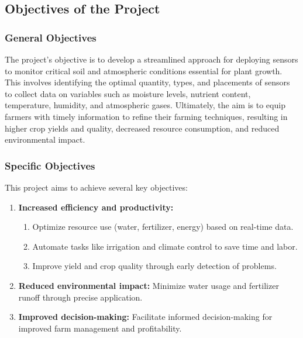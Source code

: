 \documentclass[12pt, a4paper]{article}
\begin{document}
\newpage
\subsection{Objectives of the Project}
\subsubsection{General Objectives}
The project's objective is to develop a streamlined approach for deploying sensors to monitor critical soil and atmospheric conditions essential for plant growth. This involves identifying the optimal quantity, types, and placements of sensors to collect data on variables such as moisture levels, nutrient content, temperature, humidity, and atmospheric gases. Ultimately, the aim is to equip farmers with timely information to refine their farming techniques, resulting in higher crop yields and quality, decreased resource consumption, and reduced environmental impact.
\subsubsection{Specific Objectives}
This project aims to achieve several key objectives:\\
\begin{enumerate}
\item \textbf{Increased efficiency and productivity:}
\begin{enumerate}
 \item Optimize resource use (water, fertilizer, energy) based on real-time data.
 \item Automate tasks like irrigation and climate control to save time and labor.
 \item Improve yield and crop quality through early detection of problems.
\end{enumerate}
 
\item \textbf{Reduced environmental impact:} Minimize water usage and fertilizer runoff through precise application.\\
\item \textbf{Improved decision-making:} Facilitate informed decision-making for improved farm management and profitability.
\end{enumerate}

\newpage
\end{document}
